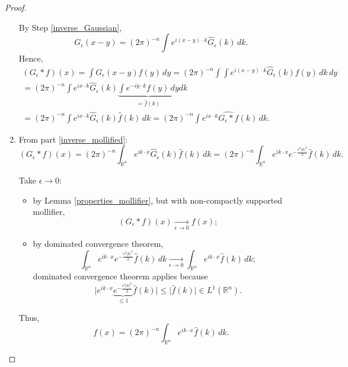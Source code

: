 \documentclass[12pt]{article}
\theoremstyle{definition}
\begin{document}
\begin{proof}
\begin{enumerate}[label=\arabic*.]
By Step \ref{inverse_Gaussian},
\[G_{\epsilon}(x-y)=(2\pi)^{-n}\int e^{i(x-y)\cdot k}\widehat{G}_{\epsilon}(k)\,dk.\]
Hence,
\begin{multline*}
(G_{\epsilon}*f)(x)=\int G_{\epsilon}(x-y)f(y)\,dy=(2\pi)^{-n}\int\int e^{i(x-y)\cdot k}\widehat{G}_{\epsilon}(k)f(y)\,dk\,dy\\
=(2\pi)^{-n}\int e^{ix\cdot k}\widehat{G}_{\epsilon}(k)\underbrace{\int e^{-iy\cdot k}f(y)\,dy}_{=\hat{f}(k)}dk\\
=(2\pi)^{-n}\int e^{ix\cdot k}\widehat{G}_{\epsilon}(k)\hat{f}(k)\,dk=(2\pi)^{-n}\int e^{ix\cdot k}\widehat{G_{\epsilon}*f}(k)\,dk.
\end{multline*}

\item From part \ref{inverse_mollified}:
\[(G_{\epsilon}*f)(x)=(2\pi)^{-n}\int_{\mathbb{R}^n}e^{ik\cdot x}\widehat{G}_{\epsilon}(k)\hat{f}(k)\,dk=(2\pi)^{-n}\int_{\mathbb{R}^n}e^{ik\cdot x}e^{-\frac{\epsilon^2|k|^2}{2}}\hat{f}(k)\,dk.\]

Take $\epsilon\to0$:
\begin{itemize}
\item by Lemma \ref{properties_mollifier}, but with non-compactly supported mollifier,
\[(G_{\epsilon}*f)(x)\xrightarrow[\epsilon\to0]{}f(x);\]
\item by dominated convergence theorem,
\[\int_{\mathbb{R}^n}e^{ik\cdot x}e^{-\frac{\epsilon^2|k|^2}{2}}\hat{f}(k)\,dk\xrightarrow[\epsilon\to0]{}\int_{\mathbb{R}^n}e^{ik\cdot x}\hat{f}(k)\,dk;\]
dominated convergence theorem applies because
\[\Big|e^{ik\cdot x}\underbrace{e^{-\frac{\epsilon^2|k|^2}{2}}}_{\leq1}\hat{f}(k)\Big|\leq\big|\hat{f}(k)\big|\in L^1(\mathbb{R}^n).\]
\end{itemize}

Thus,
\[f(x)=(2\pi)^{-n}\int_{\mathbb{R}^n}e^{ik\cdot x}\hat{f}(k)\,dk.\]
\end{enumerate}
\end{proof}

\end{document}

